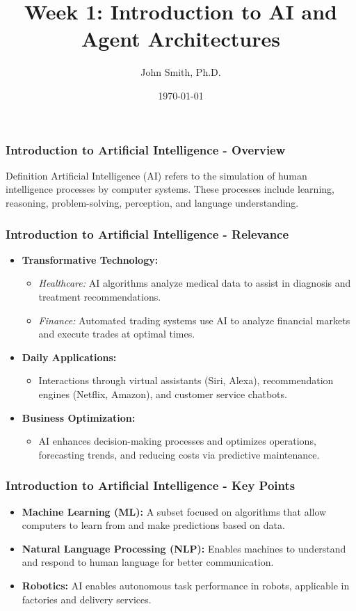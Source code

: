 \documentclass[aspectratio=169]{beamer}
\title[Introduction to AI and Agent Architectures]{Week 1: Introduction to AI and Agent Architectures}
\author[J. Smith]{John Smith, Ph.D.}
\institute[University Name]{
  Department of Computer Science\\
  University Name\\
  \vspace{0.3cm}
  Email: email@university.edu\\
  Website: www.university.edu
}
\date{\today}
\begin{document}
\frame{\titlepage}

\begin{frame}[fragile]
    \frametitle{Introduction to Artificial Intelligence - Overview}
    \begin{block}{Definition}
        Artificial Intelligence (AI) refers to the simulation of human intelligence processes by computer systems. 
        These processes include learning, reasoning, problem-solving, perception, and language understanding.
    \end{block}
\end{frame}

\begin{frame}[fragile]
    \frametitle{Introduction to Artificial Intelligence - Relevance}
    \begin{itemize}
        \item \textbf{Transformative Technology:}
            \begin{itemize}
                \item \textit{Healthcare:} AI algorithms analyze medical data to assist in diagnosis and treatment recommendations.
                \item \textit{Finance:} Automated trading systems use AI to analyze financial markets and execute trades at optimal times.
            \end{itemize}
        \item \textbf{Daily Applications:}
            \begin{itemize}
                \item Interactions through virtual assistants (Siri, Alexa), recommendation engines (Netflix, Amazon), and customer service chatbots.
            \end{itemize}
        \item \textbf{Business Optimization:}
            \begin{itemize}
                \item AI enhances decision-making processes and optimizes operations, forecasting trends, and reducing costs via predictive maintenance.
            \end{itemize}
    \end{itemize}
\end{frame}

\begin{frame}[fragile]
    \frametitle{Introduction to Artificial Intelligence - Key Points}
    \begin{itemize}
        \item \textbf{Machine Learning (ML):} A subset focused on algorithms that allow computers to learn from and make predictions based on data.
        \item \textbf{Natural Language Processing (NLP):} Enables machines to understand and respond to human language for better communication.
        \item \textbf{Robotics:} AI enables autonomous task performance in robots, applicable in factories and delivery services.
    \end{itemize}
\end{frame}
\end{document}
